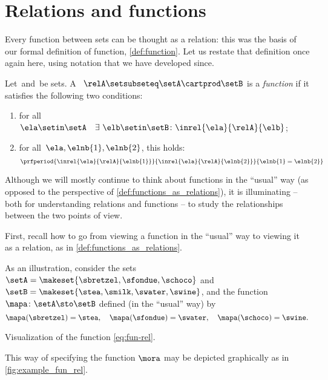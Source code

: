 
\section{Relations and functions}

Every function between sets can be thought as a relation: this was the basis of our formal definition of function, \cref{def:function}.
Let us restate that definition once again here, using notation that we have developed since.

\begin{ctdefinition}
    \label{def:functions_as_relations}
    Let~\setA and~\setB be sets.
    A ~$\relA \setsubseteq \setA \cartprod \setB$ is a \emph{function} if it satisfies the following two conditions:
    \begin{enumerate}
        \item for all~$\ela \setin \setA \quad \exists \ \elb \setin \setB\colon  \inrel{\ela}{\relA}{\elb}$;
        \item for all~$\ela, \elnb{1}, \elnb{2}$, this holds:
              \begin{equation}
                  \prfperiod{
                      \inrel{\ela}{\relA}{\elnb{1}}
                  }{
                      \inrel{\ela}{\relA}{\elnb{2}}
                  }{
                      \elnb{1} = \elnb{2}
                  }
              \end{equation}
    \end{enumerate}
\end{ctdefinition}

Although we will mostly continue to think about functions in the ``usual'' way (as opposed to the perspective of \cref{def:functions_as_relations}), it is illuminating -- both for understanding relations and functions -- to study the relationships between the two points of view.

First, recall how to go from viewing a function in the ``usual'' way to viewing it as a relation, as in \cref{def:functions_as_relations}.

As an illustration, consider the sets~$\setA = \makeset{ \sbretzel, \sfondue, \schoco }$ and~$\setB = \makeset{ \stea, \smilk, \swater, \swine }$, and the function~$\mapa \colon \setA \sto \setB$ defined (in the ``usual'' way) by
\begin{equation}
    \mapa (\sbretzel) = \stea, \quad \mapa (\sfondue) = \swater, \quad \mapa(\schoco) = \swine.
\end{equation}
\begin{marginfigure}
    \centering
    \caption{Visualization of the function \cref{eq:fun-rel}.}
    \label{fig:example_fun_rel}
\end{marginfigure}
This way of specifying the function $\mora$ may be depicted graphically as in \cref{fig:example_fun_rel}.


